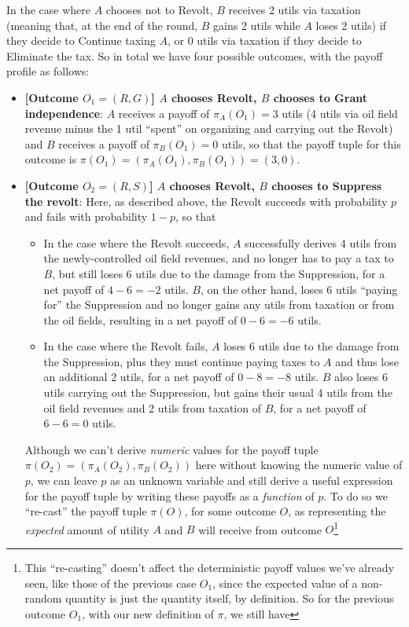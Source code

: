 In the case where $A$ chooses not to Revolt, $B$ receives 2 utils via taxation (meaning that, at the end of the round, $B$ gains 2 utils while $A$ loses 2 utils) if they decide to Continue taxing $A$, or 0 utils via taxation if they decide to Eliminate the tax. So in total we have four possible outcomes, with the payoff profile as follows:
\begin{itemize}
    \item \textbf{[Outcome $O_1 = (R,G)$] $A$ chooses Revolt, $B$ chooses to Grant independence}: $A$ receives a payoff of $\pi_A(O_1) = 3$ utils (4 utils via oil field revenue minus the 1 util ``spent'' on organizing and carrying out the Revolt) and $B$ receives a payoff of $\pi_B(O_1) = 0$ utils, so that the payoff tuple for this outcome is $\pi(O_1) = (\pi_A(O_1),\pi_B(O_1)) = (3,0)$.
    \item \textbf{[Outcome $O_2 = (R,S)$] $A$ chooses Revolt, $B$ chooses to Suppress the revolt}: Here, as described above, the Revolt succeeds with probability $p$ and fails with probability $1-p$, so that
    \begin{itemize}
        \item In the case where the Revolt succeeds, $A$ successfully derives 4 utils from the newly-controlled oil field revenues, and no longer has to pay a tax to $B$, but still loses 6 utils due to the damage from the Suppression, for a net payoff of $4-6 = -2$ utils. $B$, on the other hand, loses 6 utils ``paying for'' the Suppression and no longer gains any utils from taxation or from the oil fields, resulting in a net payoff of $0-6 = -6$ utils.
        \item In the case where the Revolt fails, $A$ loses 6 utils due to the damage from the Suppression, plus they must continue paying taxes to $A$ and thus lose an additional 2 utils, for a net payoff of $0-8 = -8$ utils. $B$ also loses 6 utils carrying out the Suppression, but gains their usual 4 utils from the oil field revenues and 2 utils from taxation of $B$, for a net payoff of $6-6 = 0$ utils.
    \end{itemize}
    Although we can't derive \textit{numeric} values for the payoff tuple $\pi(O_2) = (\pi_A(O_2), \pi_B(O_2))$ here without knowing the numeric value of $p$, we can leave $p$ as an unknown variable and still derive a useful expression for the payoff tuple by writing these payoffs as a \textit{function} of $p$. To do so we ``re-cast'' the payoff tuple $\pi(O)$, for some outcome $O$, as representing the \textit{expected} amount of utility $A$ and $B$ will receive from outcome $O$\footnote{This ``re-casting'' doesn't affect the deterministic payoff values we've already seen, like those of the previous case $O_1$, since the expected value of a non-random quantity is just the quantity itself, by definition. So for the previous outcome $O_1$, with our new definition of $\pi$, we still have
}
\end{itemize}
